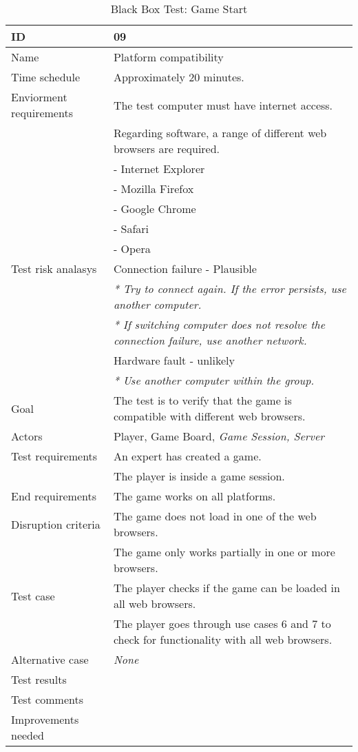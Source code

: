 
{\footnotesize
\begin{table}[H]
\begin{tabular}{| p{5cm} | p{10cm} |}\hline
	\textbf{ID}	& \textbf{09} \\ \hline
	Name		& Platform compatibility\\ \hline
	Time schedule	& Approximately 20 minutes.\\ \hline
	Enviorment requirements 
		& The test computer must have internet access. \\
		& Regarding software, a range of different web browsers are required.\\
		& - Internet Explorer\\
		& - Mozilla Firefox\\
		& - Google Chrome\\
		& - Safari\\
		& - Opera\\ \hline
	Test risk analasys
		& Connection failure - Plausible \\
		& \emph{* Try to connect again. If the error persists, use another computer.} \\
		& \emph{* If switching computer does not resolve the connection failure, use another network.}\\
		& Hardware fault - unlikely \\
		& \emph{* Use another computer within the group.} \\ \hline
	Goal	& The test is to verify that the game is compatible with different web browsers.\\ \hline
	Actors	& Player, Game Board, \emph{Game Session, Server}\\ \hline
	Test requirements
		& An expert has created a game.\\
		& The player is inside a game session.\\ \hline
	End requirements 
		& The game works on all platforms. \\ \hline
	Disruption criteria 
		& The game does not load in one of the web browsers. \\
		& The game only works partially in one or more browsers. \\ \hline
	Test case
		& The player checks if the game can be loaded in all web browsers.\\
		& The player goes through use cases 6 and 7 to check for functionality with all web browsers.\\ \hline
	Alternative case
		& \emph{None}\\ \hline
	Test results 
		& \\ \hline
	Test comments
		& \\ \hline
	Improvements needed
		& \\ \hline
\end{tabular}

\caption{Black Box Test: Game Start}
\label{fig:black_box_test_9}
\end{table}}










